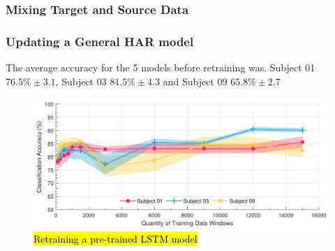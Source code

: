 

\subsubsection{Mixing Target and Source Data}


\subsubsection{Updating a General HAR model}
The average accuracy for the 5 models before retraining was.
Subject 01 $76.5\%\pm3.1$, Subject 03 $81.5\%\pm4.3$ and Subject 09 $65.8\%\pm2.7$




\begin{figure}[htbp]
    \centering
    \includegraphics[width=\textwidth]{content/5-Personalisation/ch5_pre_trained_model_accuracy.pdf}
    \caption[Retraining a pre-trained LSTM model]{\hl{Retraining a pre-trained LSTM model}}
    \label{fig:ch5_pretrained_model}
\end{figure}


